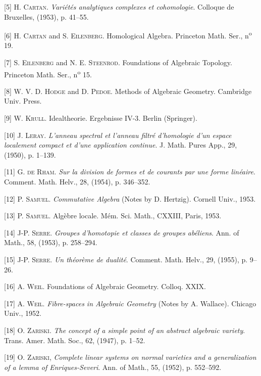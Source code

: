 [5] H. \textsc{Cartan}. \textit{Variétés analytiques complexes et cohomologie}. Colloque de Bruxelles, (1953), p. 41--55.



[6] H. \textsc{Cartan} and S. \textsc{Eilenberg}. Homological Algebra. Princeton Math. Ser., n\textsuperscript{o} 19.

[7] S. \textsc{Eilenberg} and N. E. \textsc{Steenrod}. Foundations of Algebraic Topology. Princeton Math. Ser., n\textsuperscript{o} 15.

[8] W. V. D. \textsc{Hodge} and D. \textsc{Pedoe}. Methods of Algebraic Geometry. Cambridge Univ. Press.

[9] W. \textsc{Krull}. Idealtheorie. Ergebnisse IV-3. Berlin (Springer).

[10] J. \textsc{Leray}. \textit{L'anneau spectral et l'anneau filtré d'homologie d'un espace localement compact et d'une application continue}. J. Math. Pures App., 29, (1950), p. 1--139.

[11] G. \textsc{de Rham}. \textit{Sur la division de formes et de courants par une forme linéaire}. Comment. Math. Helv., 28, (1954), p. 346--352.

[12] P. \textsc{Samuel}. \textit{Commutative Algebra} (Notes by D. Hertzig). Cornell Univ., 1953.

[13] P. \textsc{Samuel}. Algèbre locale. Mém. Sci. Math., CXXIII, Paris, 1953.

[14] J-P. \textsc{Serre}. \textit{Groupes d'homotopie et classes de groupes abéliens}. Ann. of Math., 58, (1953), p. 258--294.

[15] J-P. \textsc{Serre}. \textit{Un théorème de dualité}. Comment. Math. Helv., 29, (1955), p. 9--26.

[16] A. \textsc{Weil}. Foundations of Algebraic Geometry. Colloq. XXIX.

[17] A. \textsc{Weil}. \textit{Fibre-spaces in Algebraic Geometry} (Notes by A. Wallace). Chicago Univ., 1952.

[18] O. \textsc{Zariski}. \textit{The concept of a simple point of an abstract algebraic variety}. Trans. Amer. Math. Soc., 62, (1947), p. 1--52.

[19] O. \textsc{Zariski}, \textit{Complete linear systems on normal varieties and a generalization of a lemma of Enriques-Severi}. Ann. of Math., 55, (1952), p. 552--592.
